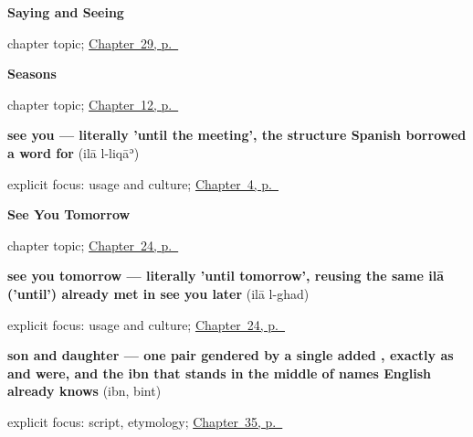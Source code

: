 \noindent\begin{minipage}[t]{\linewidth}
\raggedright
\textbf{Saying and Seeing}\par
\footnotesize chapter topic; \hyperref[ch:ar-saying-and-seeing]{Chapter~29, p.~\pageref*{ch:ar-saying-and-seeing}}
\end{minipage}\par\smallskip

\noindent\begin{minipage}[t]{\linewidth}
\raggedright
\textbf{Seasons}\par
\footnotesize chapter topic; \hyperref[ch:ar-seasons]{Chapter~12, p.~\pageref*{ch:ar-seasons}}
\end{minipage}\par\smallskip

\noindent\begin{minipage}[t]{\linewidth}
\raggedright
\textbf{see you — literally 'until the meeting', the structure Spanish borrowed a word for}\enspace\emph{ }\enspace(ilā l-liqāʾ)\par
\footnotesize explicit focus: usage and culture; \hyperref[ch:ar-farewells]{Chapter~4, p.~\pageref*{ch:ar-farewells}}
\end{minipage}\par\smallskip

\noindent\begin{minipage}[t]{\linewidth}
\raggedright
\textbf{See You Tomorrow}\par
\footnotesize chapter topic; \hyperref[ch:ar-see-you-tomorrow]{Chapter~24, p.~\pageref*{ch:ar-see-you-tomorrow}}
\end{minipage}\par\smallskip

\noindent\begin{minipage}[t]{\linewidth}
\raggedright
\textbf{see you tomorrow — literally 'until tomorrow', reusing the same ilā ('until') already met in see you later}\enspace\emph{ }\enspace(ilā l-ghad)\par
\footnotesize explicit focus: usage and culture; \hyperref[ch:ar-see-you-tomorrow]{Chapter~24, p.~\pageref*{ch:ar-see-you-tomorrow}}
\end{minipage}\par\smallskip

\noindent\begin{minipage}[t]{\linewidth}
\raggedright
\textbf{son and daughter — one pair gendered by a single added , exactly as  and  were, and the ibn that stands in the middle of names English already knows}\enspace\emph{ }\enspace(ibn, bint)\par
\footnotesize explicit focus: script, etymology; \hyperref[ch:ar-people-you-introduce]{Chapter~35, p.~\pageref*{ch:ar-people-you-introduce}}
\end{minipage}\par\smallskip

